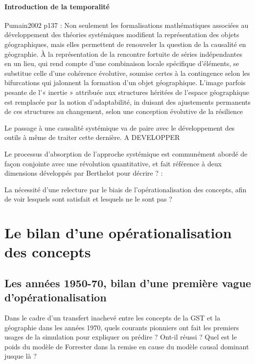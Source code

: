 {\paragraph{Introduction de la temporalité}

Pumain2002 p137 :
Non seulement les formalisations mathématiques associées au développement des théories systémiques modifient la représentation des objets géographiques, mais elles permettent de renouveler la question de la causalité en géographie. À la représentation de la rencontre fortuite de séries indépendantes en un lieu, qui rend compte d’une combinaison locale spécifique d’éléments, se substitue celle d’une cohérence évolutive, soumise certes à la contingence selon les bifurcations qui jalonnent la formation d’un objet géographique. L’image parfois pesante de l’« inertie » attribuée aux structures héritées de l’espace géographique est remplacée par la notion d’adaptabilité, in duisant des ajustements permanents de ces structures au changement, selon une conception évolutive de la résilience

Le passage à une causalité systémique va de paire avec le développement des outils à même de traiter cette dernière. A DEVELOPPER

Le processus d'absorption de l'approche systémique est communément abordé de façon conjointe avec une révolution quantitative, et fait référence à deux dimensions développés par Berthelot pour décrire ? :   %

La nécessité d'une relecture par le biais de l'opérationalisation des concepts, afin de voir lesquels sont satisfait et lesquels ne le sont pas ? 

\section{Le bilan d'une opérationalisation des concepts}

\subsection{Les années 1950-70, bilan d'une première vague d'opérationalisation }
\label{ssubsec:operationaliser_concept}

Dans le cadre d'un transfert inachevé entre les concepts de la GST et la géographie dans les années 1970, quels courants pionniers ont fait les premiers usages de la simulation pour expliquer ou prédire ? Ont-il réussi ? Quel est le poids du modèle de Forrester dans la remise en cause du modèle causal dominant jusque là ? 

}
